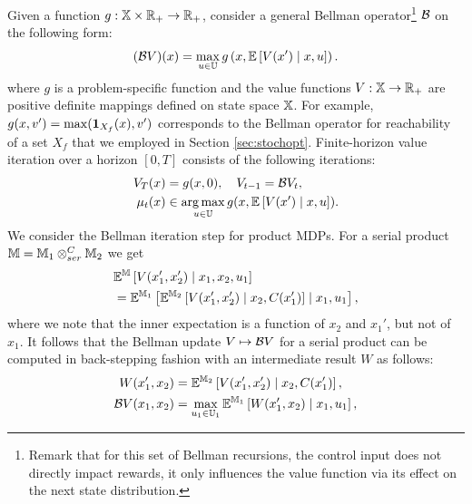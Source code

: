 \documentclass[conference]{IEEEtran}
\begin{document}
Given a function $g: \mathbb{X} \times \mathbb{R}_+ \rightarrow \mathbb{R}_+$, consider a general Bellman operator\footnote{Remark that for this set of Bellman recursions, the control input does not directly impact rewards, it only influences the value function via its effect on the next state distribution.} $\mathcal{B}$ on the following form:
\begin{equation}
(\mathcal{B} V) (x) =  \max_{u \in \mathbb{U}} g \left( x, \mathbb E \left[  V(x') \mid x,u \right] \right).
\end{equation}
where $g$ is a problem-specific function and the value functions $V:\mathbb{X}\rightarrow \mathbb{R}_+$ are positive definite mappings defined on state space $\mathbb{X}$. For example, $g(x, v') = \max(\mathbf{1}_{X_f}(x), v')$ corresponds to the Bellman operator for reachability of a set $X_f$ that we employed in Section \ref{sec:stochopt}. Finite-horizon value iteration over a horizon $[0, T]$ consists of the following iterations:
\begin{equation}
\begin{aligned}
	V_T(x) & = g(x, 0), \quad V_{t-1} = \mathcal{B} V_t,\\
	\mu_t(x) & \in \operatorname*{arg\,max}_{u \in \mathbb{U}} g(x, \mathbb{E}\left[ V(x') \mid x,u \right]).
\end{aligned}
\end{equation}
We consider the Bellman iteration step for product MDPs. For a serial product $\mathbb{M} = \mathbb{M}_1 \otimes_{ser}^{C} \mathbb{M}_2$ we get
\begin{equation*}
\begin{aligned}
	&  \mathbb{E}^{\mathbb{M}}\left[ V(x_1', x_2') \mid x_1, x_2, u_1 \right] \\ 
	& = \mathbb{E}^{\mathbb{M}_1} \left[ \mathbb{E}^{\mathbb{M}_2} \left[ V(x_1', x_2') \mid x_2, C(x_1')  \right] \mid x_1, u_1   \right],
\end{aligned}
\end{equation*}
where we note that the inner expectation is a function of $x_2$ and $x_1'$, but not of $x_1$. It follows that the Bellman update $V \mapsto \mathcal{B} V$ for a serial product can be computed in back-stepping fashion with an intermediate result $W$ as follows:
\begin{equation*}
\begin{aligned}
	W(x_1', x_2) & = \mathbb{E}^{\mathbb{M}_2} \left[ V(x_1', x_2') \mid x_2, C(x_1')  \right], \\
	\mathcal{B} V(x_1, x_2) & = \max_{u_1 \in \mathbb{U}_1} \mathbb{E}^{\mathbb{M}_1} \left[ W(x_1', x_2) \mid x_1, u_1   \right], \\
\end{aligned}
\end{equation*}
\end{document}

